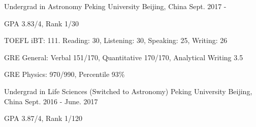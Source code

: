 


\begin{cventries}


\cventry
{Undergrad in Astronomy} %
{Peking University} %
{Beijing, China} %
{Sept. 2017 - } %
{ %
	\begin{cvitems}
		\item {GPA 3.83/4, Rank 1/30}
		\item {TOEFL iBT: 111. Reading: 30, Listening: 30, Speaking: 25, Writing: 26}
		\item {GRE General: Verbal 151/170, Quantitative 170/170, Analytical Writing 3.5}
		\item {GRE Physics: 970/990, Percentile 93\%}
	\end{cvitems}
}

\cventry
{Undergrad in Life Sciences (Switched to Astronomy)} %
{Peking University} %
{Beijing, China} %
{Sept. 2016 - June. 2017} %
{ %
	\begin{cvitems}
		\item {GPA 3.87/4, Rank 1/120}
	\end{cvitems}
}


\end{cventries}